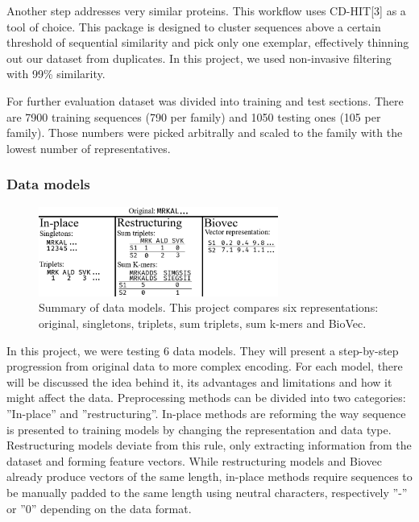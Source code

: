 \documentclass[12pt]{article}
\begin{document}
Another step addresses very similar proteins. This workflow uses CD-HIT[3] as a tool of choice. This package is designed to cluster sequences above a certain threshold of sequential similarity and pick only one exemplar, effectively thinning out our dataset from duplicates. In this project, we used non-invasive filtering with 99\% similarity. 

For further evaluation dataset was divided into training and test sections. There are 7900 training sequences (790 per family) and 1050 testing ones (105 per family). Those numbers were picked arbitrally and scaled to the family with the lowest number of representatives.

\subsubsection*{Data models}
\begin{figure}[H]
\begin{center}
\includegraphics[width=0.7\textwidth]{vec}
\caption{Summary of data models. This project compares six representations: original, singletons, triplets, sum triplets, sum k-mers and BioVec.}
\end{center}
\end{figure}

In this project, we were testing 6 data models. They will present a step-by-step progression from original data to more complex encoding. For each model, there will be discussed the idea behind it, its advantages and limitations and how it might affect the data. Preprocessing methods can be divided into two categories: ''In-place'' and ''restructuring''. In-place methods are reforming the way sequence is presented to training models by changing the representation and data type. Restructuring models deviate from this rule, only extracting information from the dataset and forming feature vectors. While restructuring models and Biovec already produce vectors of the same length, in-place methods require sequences to be manually padded to the same length using neutral characters, respectively ''-'' or ''0'' depending on the data format. 
\end{document}
